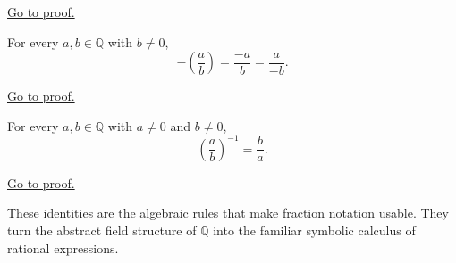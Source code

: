 \begin{remark*}[Proof]
\hyperref[prf:rational-fraction-multiplication]{Go to proof.}
\end{remark*}

\begin{theorem}
\label{thm:rational-fraction-negation}
For every $a,b\in\mathbb{Q}$ with $b\neq 0$,
\[
-\left(\frac{a}{b}\right)
=
\frac{-a}{b}
=
\frac{a}{-b}.
\]
\end{theorem}

\begin{remark*}[Proof]
\hyperref[prf:rational-fraction-negation]{Go to proof.}
\end{remark*}

\begin{theorem}
\label{thm:rational-fraction-reciprocal}
For every $a,b\in\mathbb{Q}$ with $a\neq 0$ and $b\neq 0$,
\[
\left(\frac{a}{b}\right)^{-1}=\frac{b}{a}.
\]
\end{theorem}

\begin{remark*}[Proof]
\hyperref[prf:rational-fraction-reciprocal]{Go to proof.}
\end{remark*}

\begin{remark*}
These identities are the algebraic rules that make fraction notation usable.
They turn the abstract field structure of $\mathbb{Q}$ into the familiar
symbolic calculus of rational expressions.
\end{remark*}
